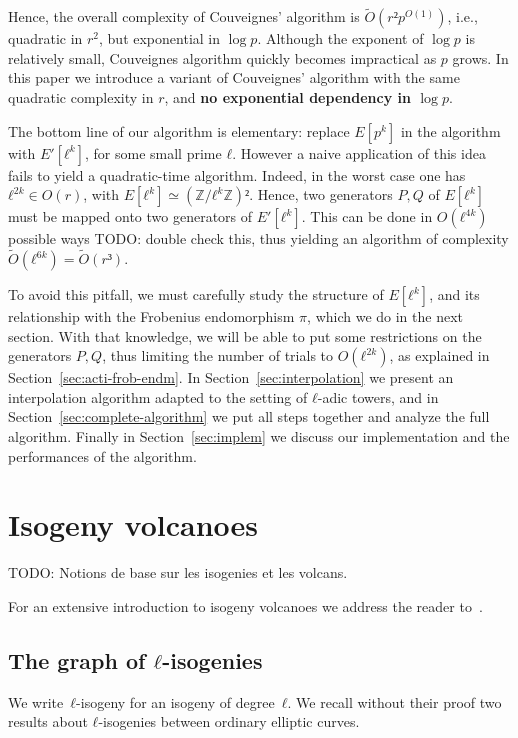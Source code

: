 \documentclass{lms}
\newcommand{\todo}[1]{{\color{red}TODO: #1}}
\newcommand{\tildO}{\tilde{O}}
\begin{document}
Hence, the overall complexity of Couveignes' algorithm is
$\tildO(r²p^{O(1)})$, i.e., quadratic in $r^2$, but exponential in
$\log p$. Although the exponent of $\log p$ is relatively small, Couveignes
algorithm quickly becomes impractical as $p$ grows. In this paper we
introduce a variant of Couveignes' algorithm with the same quadratic
complexity in $r$, and \textbf{no exponential dependency in $\log p$}.

The bottom line of our algorithm is elementary: replace $E[p^k]$ in
the algorithm with $E'[ℓ^k]$, for some small prime $ℓ$. However a
naive application of this idea fails to yield a quadratic-time
algorithm. Indeed, in the worst case one has $ℓ^{2k}∈O(r)$, with
$E[ℓ^k]≃(ℤ/ℓ^kℤ)²$. Hence, two generators $P,Q$ of $E[ℓ^k]$ must
be mapped onto two generators of $E'[ℓ^k]$. This can be done in
$O(ℓ^{4k})$ possible ways \todo{double check this}, thus yielding an
algorithm of complexity $\tildO(ℓ^{6k})=\tildO(r³)$.

To avoid this pitfall, we must carefully study the structure of
$E[ℓ^k]$, and its relationship with the Frobenius endomorphism $π$,
which we do in the next section. With that knowledge, we will be able
to put some restrictions on the generators $P,Q$, thus limiting the
number of trials to $O(ℓ^{2k})$, as explained in
Section~\ref{sec:acti-frob-endm}.  In Section~\ref{sec:interpolation}
we present an interpolation algorithm adapted to the setting of
$ℓ$-adic towers, and in Section~\ref{sec:complete-algorithm} we put
all steps together and analyze the full algorithm. Finally in
Section~\ref{sec:implem} we discuss our implementation and the
performances of the algorithm.



\section{Isogeny volcanoes}
\label{sec:isogeny-volcanoes}

\todo{Notions de base sur les isogenies et les volcans.}

For an extensive introduction to isogeny volcanoes we address the
reader to~\cite{sutherland2013isogeny}.

\subsection{The graph of $ℓ$-isogenies}

We write~{$ℓ$-isogeny} for an isogeny of degree~$ℓ$.
We recall without their proof two results about
$ℓ$-isogenies between ordinary elliptic curves.
\end{document}
